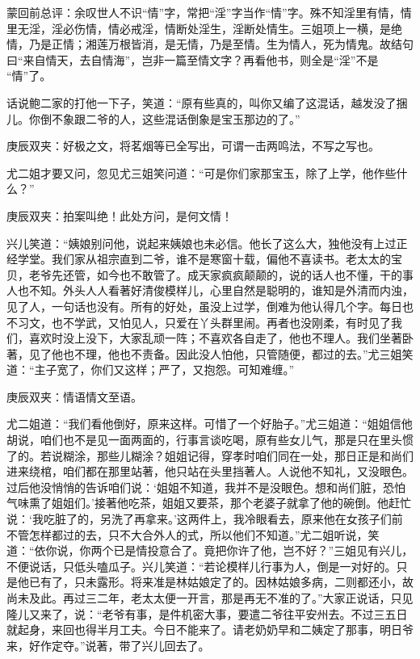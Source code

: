 
\begin{parag}
    \begin{note}蒙回前总评：余叹世人不识“情”字，常把“淫”字当作“情”字。殊不知淫里有情，情里无淫，淫必伤情，情必戒淫，情断处淫生，淫断处情生。三姐项上一横，是绝情，乃是正情；湘莲万根皆消，是无情，乃是至情。生为情人，死为情鬼。故结句曰“来自情天，去自情海”，岂非一篇至情文字？再看他书，则全是“淫”不是 “情”了。\end{note}
\end{parag}


\begin{parag}
    话说鲍二家的打他一下子，笑道：“原有些真的，叫你又编了这混话，越发没了捆儿。你倒不象跟二爷的人，这些混话倒象是宝玉那边的了。”\begin{note}庚辰双夹：好极之文，将茗烟等已全写出，可谓一击两鸣法，不写之写也。\end{note}尤二姐才要又问，忽见尤三姐笑问道：“可是你们家那宝玉，除了上学，他作些什么？”\begin{note}庚辰双夹：拍案叫绝！此处方问，是何文情！\end{note}兴儿笑道：“姨娘别问他，说起来姨娘也未必信。他长了这么大，独他没有上过正经学堂。我们家从祖宗直到二爷，谁不是寒窗十载，偏他不喜读书。老太太的宝贝，老爷先还管，如今也不敢管了。成天家疯疯颠颠的，说的话人也不懂，干的事人也不知。外头人人看著好清俊模样儿，心里自然是聪明的，谁知是外清而内浊，见了人，一句话也没有。所有的好处，虽没上过学，倒难为他认得几个字。每日也不习文，也不学武，又怕见人，只爱在丫头群里闹。再者也没刚柔，有时见了我们，喜欢时没上没下，大家乱顽一阵；不喜欢各自走了，他也不理人。我们坐著卧著，见了他也不理，他也不责备。因此没人怕他，只管随便，都过的去。”尤三姐笑道：“主子宽了，你们又这样；严了，又抱怨。可知难缠。”\begin{note}庚辰双夹：情语情文至语。\end{note}尤二姐道：“我们看他倒好，原来这样。可惜了一个好胎子。”尤三姐道：“姐姐信他胡说，咱们也不是见一面两面的，行事言谈吃喝，原有些女儿气，那是只在里头惯了的。若说糊涂，那些儿糊涂？姐姐记得，穿孝时咱们同在一处，那日正是和尚们进来绕棺，咱们都在那里站著，他只站在头里挡著人。人说他不知礼，又没眼色。过后他没悄悄的告诉咱们说：‘姐姐不知道，我并不是没眼色。想和尚们脏，恐怕气味熏了姐姐们。’接著他吃茶，姐姐又要茶，那个老婆子就拿了他的碗倒。他赶忙说：‘我吃脏了的，另洗了再拿来。’这两件上，我冷眼看去，原来他在女孩子们前不管怎样都过的去，只不大合外人的式，所以他们不知道。”尤二姐听说，笑道：“依你说，你两个已是情投意合了。竟把你许了他，岂不好？”三姐见有兴儿，不便说话，只低头嗑瓜子。兴儿笑道：“若论模样儿行事为人，倒是一对好的。只是他已有了，只未露形。将来准是林姑娘定了的。因林姑娘多病，二则都还小，故尚未及此。再过三二年，老太太便一开言，那是再无不准的了。”大家正说话，只见隆儿又来了，说：“老爷有事，是件机密大事，要遣二爷往平安州去。不过三五日就起身，来回也得半月工夫。今日不能来了。请老奶奶早和二姨定了那事，明日爷来，好作定夺。”说著，带了兴儿回去了。
\end{parag}


